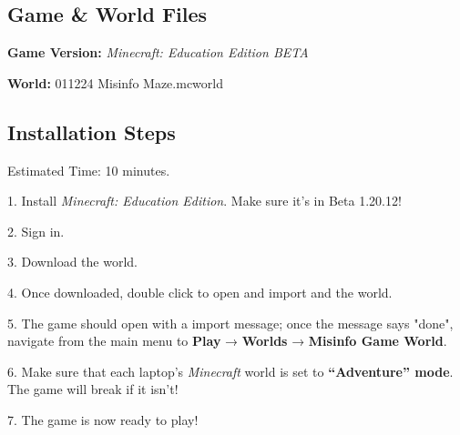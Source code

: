 \subsection{Game \& World Files}
\textbf{Game Version:} \textit{Minecraft: Education Edition BETA}

\textbf{World:} 011224 Misinfo Maze.mcworld %

\subsection{Installation Steps}
Estimated Time: 10 minutes. %

1.	Install \textit{Minecraft: Education Edition}. Make sure it's in Beta 1.20.12!

2.	Sign in.

3.	Download the world.

4.	Once downloaded, double click to open and import and the world.

5.	The game should open with a import message; once the message says "done", navigate from the main menu to \textbf{Play} → \textbf{Worlds} → \textbf{Misinfo Game World}.

6.	Make sure that each laptop’s \textit{Minecraft} world is set to \textbf{“Adventure” mode}. The game will break if it isn't!

7.	The game is now ready to play!

